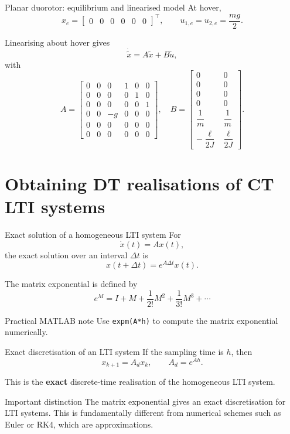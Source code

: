 \documentclass[aspectratio=169,10pt]{beamer}
\newcommand{\T}{^\top}
\begin{document}
\begin{frame}{Planar duorotor: equilibrium and linearised model}
At hover,
\[
x_e=
\begin{bmatrix}
0&0&0&0&0&0
\end{bmatrix}\T,
\qquad
u_{1,e}=u_{2,e}=\frac{mg}{2}.
\]

Linearising about hover gives
\[
\dot{\tilde{x}}=A\tilde{x}+B\tilde{u},
\]
with
\[
A=
\begin{bmatrix}
0 & 0 & 0 & 1 & 0 & 0\\
0 & 0 & 0 & 0 & 1 & 0\\
0 & 0 & 0 & 0 & 0 & 1\\
0 & 0 & -g & 0 & 0 & 0\\
0 & 0 & 0 & 0 & 0 & 0\\
0 & 0 & 0 & 0 & 0 & 0
\end{bmatrix},
\quad
B=
\begin{bmatrix}
0 & 0\\
0 & 0\\
0 & 0\\
0 & 0\\
\dfrac{1}{m} & \dfrac{1}{m}\\[4pt]
-\dfrac{\ell}{2J} & \dfrac{\ell}{2J}
\end{bmatrix}.
\]
\end{frame}

\section{Obtaining DT realisations of CT LTI systems}

\begin{frame}{Exact solution of a homogeneous LTI system}
For
\[
\dot{x}(t)=Ax(t),
\]
the exact solution over an interval \(\Delta t\) is
\[
x(t+\Delta t)=e^{A\Delta t}x(t).
\]

The matrix exponential is defined by
\[
e^M = I + M + \frac{1}{2!}M^2 + \frac{1}{3!}M^3 + \cdots
\]

\begin{notebox}{Practical MATLAB note}
Use \texttt{expm(A*h)} to compute the matrix exponential numerically.
\end{notebox}
\end{frame}

\begin{frame}{Exact discretisation of an LTI system}
If the sampling time is \(h\), then
\[
x_{k+1}=A_d x_k,
\qquad
A_d=e^{Ah}.
\]

This is the \textbf{exact} discrete-time realisation of the homogeneous LTI system.

\begin{alertbox}{Important distinction}
The matrix exponential gives an exact discretisation for LTI systems.
This is fundamentally different from numerical schemes such as Euler or RK4, which are approximations.
\end{alertbox}
\end{frame}
\end{document}
